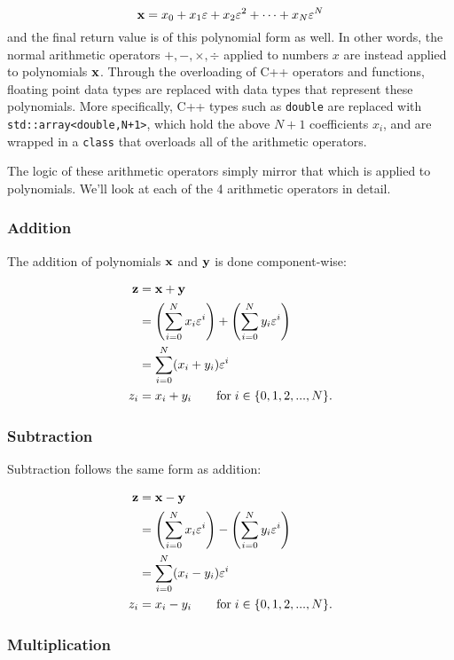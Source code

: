 \documentclass{article}
\begin{document}
\[
{\bf x} = x_0 + x_1\varepsilon + x_2\varepsilon^2 +\cdots+ x_N\varepsilon^N
\]
and the final return value is of this polynomial form as well. In other words, the normal arithmetic operators
$+,-,\times,\div$ applied to numbers $x$ are instead applied to polynomials $\bf x$. Through the overloading of C++
operators and functions, floating point data types are replaced with data types that represent these polynomials. More
specifically, C++ types such as {\tt double} are replaced with {\tt std::array<double,N+1>}, which hold the above
$N+1$ coefficients $x_i$, and are wrapped in a {\tt class} that overloads all of the arithmetic operators.

The logic of these arithmetic operators simply mirror that which is applied to polynomials. We'll look at
each of the 4 arithmetic operators in detail.

\subsubsection{Addition}

The addition of polynomials $\bf x$ and $\bf y$ is done component-wise:

\begin{align*}
{\bf z} &= {\bf x} + {\bf y} \\
 &= \left(\sum_{i=0}^Nx_i\varepsilon^i\right) + \left(\sum_{i=0}^Ny_i\varepsilon^i\right) \\
 &= \sum_{i=0}^N(x_i+y_i)\varepsilon^i \\
z_i &= x_i + y_i \qquad \text{for}\; i\in\{0,1,2,...,N\}.
\end{align*}

\subsubsection{Subtraction}

Subtraction follows the same form as addition:

\begin{align*}
{\bf z} &= {\bf x} - {\bf y} \\
 &= \left(\sum_{i=0}^Nx_i\varepsilon^i\right) - \left(\sum_{i=0}^Ny_i\varepsilon^i\right) \\
 &= \sum_{i=0}^N(x_i-y_i)\varepsilon^i \\
z_i &= x_i - y_i \qquad \text{for}\; i\in\{0,1,2,...,N\}.
\end{align*}

\subsubsection{Multiplication}
\end{document}
